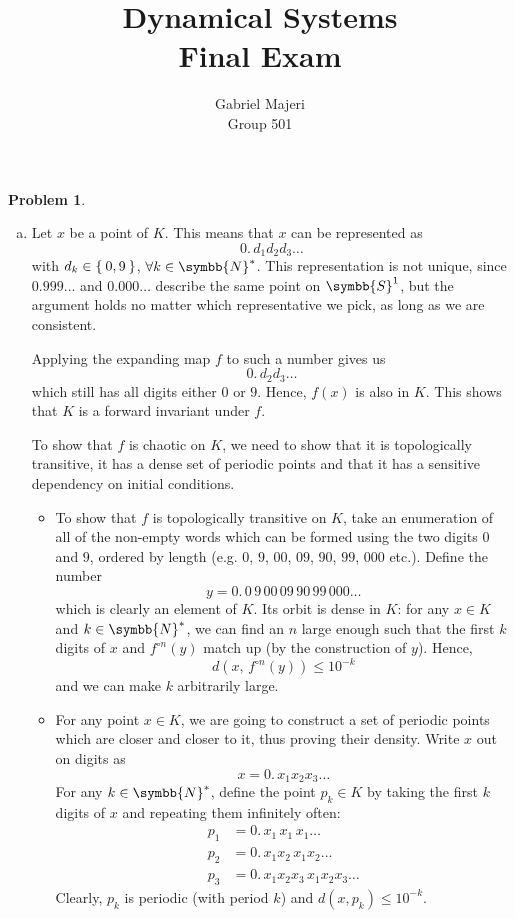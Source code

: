 \documentclass[a4paper, 12pt]{article}
\title{Dynamical Systems \\ Final Exam}
\author{Gabriel Majeri \\ Group 501}
\date{}
\theoremstyle{definition}
\newtheorem{problem}{Problem}
\newcommand*{\naturals}{\symbb{N}}
\begin{document}
\maketitle

\begin{problem}
~
\begin{enumerate}[a)]
    \item Let \(x\) be a point of \(K\). This means that \(x\) can be represented as
    \[
        0. \, d_1 d_2 d_3 \dots
    \]
    with \(d_k \in \Set{ 0, 9 }\), \(\forall k \in \naturals^*\). This representation is not unique, since \(0.999\dots\) and \(0.000\dots\) describe the same point on \(\symbb{S}^1\), but the argument holds no matter which representative we pick, as long as we are consistent.

    Applying the expanding map \(f\) to such a number gives us
    \[
        0. \, d_2 d_3 \dots
    \]
    which still has all digits either \(0\) or \(9\). Hence, \(f(x)\) is also in \(K\). This shows that \(K\) is a forward invariant under \(f\).

    To show that \(f\) is chaotic on \(K\), we need to show that it is topologically transitive, it has a dense set of periodic points and that it has a sensitive dependency on initial conditions.

    \begin{itemize}
        \item To show that \(f\) is topologically transitive on \(K\), take an enumeration of all of the non-empty words which can be formed using the two digits \(0\) and \(9\), ordered by length (e.g. \(0\), \(9\), \(00\), \(09\), \(90\), \(99\), \(000\) etc.). Define the number
        \[
            y = 0. \, 0 \, 9 \, 00 \, 09 \, 90 \, 99 \, 000 \dots
        \]
        which is clearly an element of \(K\). Its orbit is dense in \(K\): for any \(x \in K\) and \(k \in \naturals^*\), we can find an \(n\) large enough such that the first \(k\) digits of \(x\) and \(f^{\circ n} (y)\) match up (by the construction of \(y\)). Hence,
        \[
            d \left(x, \, f^{\circ n} (y)\right) \leq 10^{-k}
        \]
        and we can make \(k\) arbitrarily large.

        \item For any point \(x \in K\), we are going to construct a set of periodic points which are closer and closer to it, thus proving their density. Write \(x\) out on digits as
        \[
            x = 0. \, x_1 x_2 x_3 \dots
        \]
        For any \(k \in \naturals^*\), define the point \(p_k \in K\) by taking the first \(k\) digits of \(x\) and repeating them infinitely often:
        \begin{align*}
            p_1 &= 0. \, x_1 \, x_1 \, x_1 \dots \\
            p_2 &= 0. \, x_1 x_2 \, x_1 x_2 \dots \\
            p_3 &= 0. \, x_1 x_2 x_3 \, x_1 x_2 x_3 \dots
        \end{align*}
        Clearly, \(p_k\) is periodic (with period \(k\)) and \(d \left(x, p_k\right) \leq 10^{-k}\).


\end{itemize}
\end{enumerate}
\end{problem}
\end{document}
